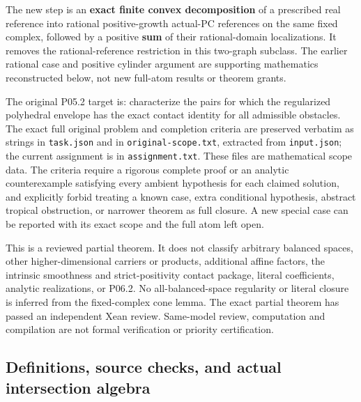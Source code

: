 \documentclass[
  11pt,
]{article}
\begin{document}
The new step is an \textbf{exact finite convex decomposition} of a
prescribed real reference into rational positive-growth actual-PC
references on the same fixed complex, followed by a positive
\textbf{sum} of their rational-domain localizations. It removes the
rational-reference restriction in this two-graph subclass. The earlier
rational case and positive cylinder argument are supporting mathematics
reconstructed below, not new full-atom results or theorem grants.

The original P05.2 target is: characterize the pairs for which the
regularized polyhedral envelope has the exact contact identity for all
admissible obstacles. The exact full original problem and completion
criteria are preserved verbatim as strings in \texttt{task.json} and in
\texttt{original-scope.txt}, extracted from \texttt{input.json}; the
current assignment is in \texttt{assignment.txt}. These files are
mathematical scope data. The criteria require a rigorous complete proof
or an analytic counterexample satisfying every ambient hypothesis for
each claimed solution, and explicitly forbid treating a known case,
extra conditional hypothesis, abstract tropical obstruction, or narrower
theorem as full closure. A new special case can be reported with its
exact scope and the full atom left open.

This is a reviewed partial theorem. It does not
classify arbitrary balanced spaces, other higher-dimensional carriers or
products, additional affine factors, the intrinsic smoothness and
strict-positivity contact package, literal coefficients, analytic
realizations, or P06.2. No all-balanced-space regularity or literal
closure is inferred from the fixed-complex cone lemma. The exact partial theorem has passed an independent Xean review.
Same-model review, computation and compilation are not formal
verification or priority certification.

\subsection{Definitions, source checks, and actual intersection
algebra}\label{definitions-source-checks-and-actual-intersection-algebra}
\end{document}
